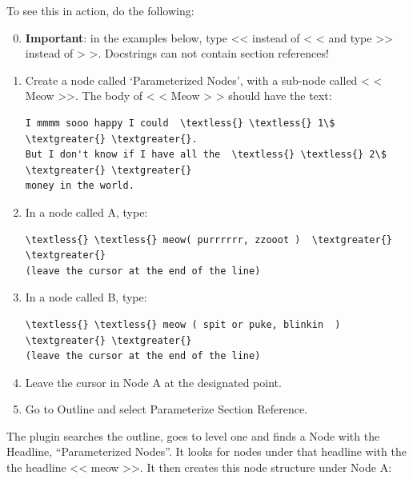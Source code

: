 \documentclass[a4paper,10pt,english]{sphinxmanual}
\begin{document}
To see this in action, do the following:
\begin{enumerate}
\setcounter{enumi}{-1}
\item {} 
\textbf{Important}: in the examples below, type \textless{}\textless{} instead of \textless{} \textless{} and
type \textgreater{}\textgreater{} instead of \textgreater{} \textgreater{}.  Docstrings can not contain section references!

\item {} 
Create a node called `Parameterized Nodes', with a sub-node called  \textless{} \textless{} Meow \textgreater{}\textgreater{}.
The body of \textless{} \textless{} Meow \textgreater{} \textgreater{} should have the text:

\begin{Verbatim}[commandchars=\\\{\}]
I mmmm sooo happy I could  \textless{} \textless{} 1\$  \textgreater{} \textgreater{}.
But I don't know if I have all the  \textless{} \textless{} 2\$  \textgreater{} \textgreater{}
money in the world.
\end{Verbatim}

\item {} 
In a node called A, type:

\begin{Verbatim}[commandchars=\\\{\}]
\textless{} \textless{} meow( purrrrrr, zzooot )  \textgreater{} \textgreater{}
(leave the cursor at the end of the line)
\end{Verbatim}

\item {} 
In a node called B, type:

\begin{Verbatim}[commandchars=\\\{\}]
 \textless{} \textless{} meow ( spit or puke, blinkin  )  \textgreater{} \textgreater{}
(leave the cursor at the end of the line)
\end{Verbatim}

\item {} 
Leave the cursor in Node A at the designated point.

\item {} 
Go to Outline and select Parameterize Section Reference.

\end{enumerate}

The plugin searches the outline, goes to level one and finds a Node with the Headline,
``Parameterized Nodes''. It looks for nodes under that headline with the the headline
\textless{}\textless{} meow \textgreater{}\textgreater{}. It then creates this node structure under Node A:
\end{document}
